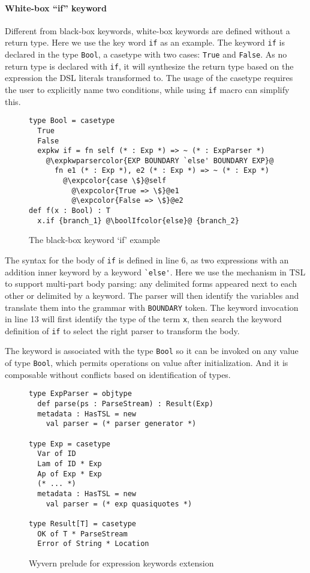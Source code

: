 \documentclass{sig-alternate}
\newcommand{\expkwparsercolor}[1]{\textcolor[HTML]{336699}{#1}}
\newcommand{\expcolor}[1]{\textcolor[HTML]{FF0033}{#1}}
\newcommand{\boolIfcolor}[1]{\textcolor[HTML]{5E0C0C}{#1}}
\begin{document}
\paragraph{White-box ``if'' keyword}
Different from black-box keywords, white-box keywords are defined without a return type. Here we use the key word \verb|if| as an example. The keyword \verb|if| is declared in the type \verb|Bool|, a casetype with two cases: \verb|True| and \verb|False|. As no return type is declared with \verb|if|, it will synthesize the return type based on the expression the DSL literals transformed to. The usage of the casetype requires the user to explicitly name two conditions, while using \verb|if| macro can simplify this.
\begin{figure}[ht]
\begin{lstlisting}[style=wyvern]
type Bool = casetype 
  True
  False
  expkw if = fn self (* : Exp *) => ~ (* : ExpParser *)
    @\expkwparsercolor{EXP BOUNDARY `else' BOUNDARY EXP}@
      fn e1 (* : Exp *), e2 (* : Exp *) => ~ (* : Exp *)
        @\expcolor{case \$}@self
          @\expcolor{True => \$}@e1
          @\expcolor{False => \$}@e2
def f(x : Bool) : T
  x.if {branch_1} @\boolIfcolor{else}@ {branch_2}
\end{lstlisting}
\caption{The black-box keyword `if' example}
\label{if-example}
\end{figure}

The syntax for the body of \verb|if| is defined in line 6, as two expressions with an addition inner keyword by a keyword \verb|`else'|. Here we use the mechanism in TSL to support multi-part body parsing: any delimited forms appeared next to each other or delimited by a keyword. The parser will then identify the variables and translate them into the grammar with \verb|BOUNDARY| token. The keyword invocation in line 13 will first identify the type of the term \verb|x|, then search the keyword definition of \verb|if| to select the right parser to transform the body. 

The keyword is associated with the type \verb|Bool| so it can be invoked on any value of type \verb|Bool|, which permits operations on value after initialization. And it is composable without conflicts based on identification of types. 

\begin{figure}[ht!]
\begin{lstlisting}[style=wyvern]
type ExpParser = objtype
  def parse(ps : ParseStream) : Result(Exp)
  metadata : HasTSL = new 
    val parser = (* parser generator *)

type Exp = casetype
  Var of ID
  Lam of ID * Exp
  Ap of Exp * Exp
  (* ... *)
  metadata : HasTSL = new
    val parser = (* exp quasiquotes *)

type Result[T] = casetype
  OK of T * ParseStream
  Error of String * Location
\end{lstlisting}
\caption{Wyvern prelude for expression keywords extension}
\end{figure}
\end{document}
